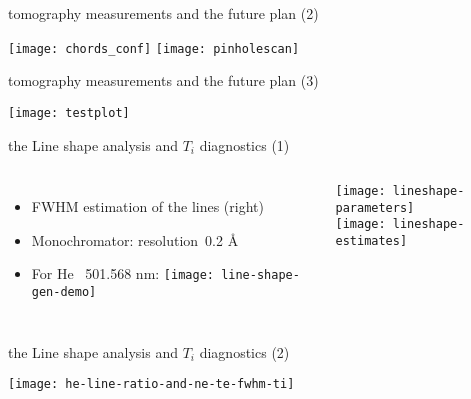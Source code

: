 \begin{CJK*}{UTF8}{kai}
\begin{frame}{tomography measurements and the future plan (2)}
    \vspace{-0.5em}
    \begin{center}
        \texttt{[image: chords\_conf]}
        \texttt{[image: pinholescan]}
    \end{center}
\end{frame}

\begin{frame}{tomography measurements and the future plan (3)}
    \vspace{-0.5em}
    \begin{center}
        \texttt{[image: testplot]}
    \end{center}
\end{frame}

\begin{frame}{the Line shape analysis and $T_i$ diagnostics (1)}
    \begin{columns}
      \centering
      \begin{itemize}
        \item FWHM estimation of the lines (right)
        \item Monochromator: resolution~0.2 \AA%
        \item For He ~501.568 nm:
            \texttt{[image: line-shape-gen-demo]}
      \end{itemize}

      \begin{center}
        \texttt{[image: lineshape-parameters]}\\
		\texttt{[image: lineshape-estimates]}
      \end{center}
    \end{columns}
\end{frame}

\begin{frame}{the Line shape analysis and $T_i$ diagnostics (2)}
    \vspace{-0.5em}
    \begin{center}
        \texttt{[image: he-line-ratio-and-ne-te-fwhm-ti]}
    \end{center}
\end{frame}

\backupframeend

\end{CJK*}

